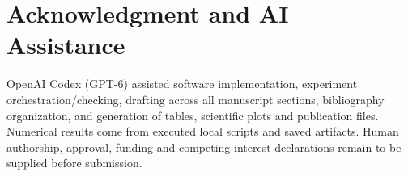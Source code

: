 \documentclass[conference,letterpaper]{IEEEtran}
\begin{document}
\section*{Acknowledgment and AI Assistance}
OpenAI Codex (GPT-6) assisted software implementation, experiment orchestration/checking, drafting across all manuscript sections, bibliography organization, and generation of tables, scientific plots and publication files. Numerical results come from executed local scripts and saved artifacts. Human authorship, approval, funding and competing-interest declarations remain to be supplied before submission.


\end{document}

